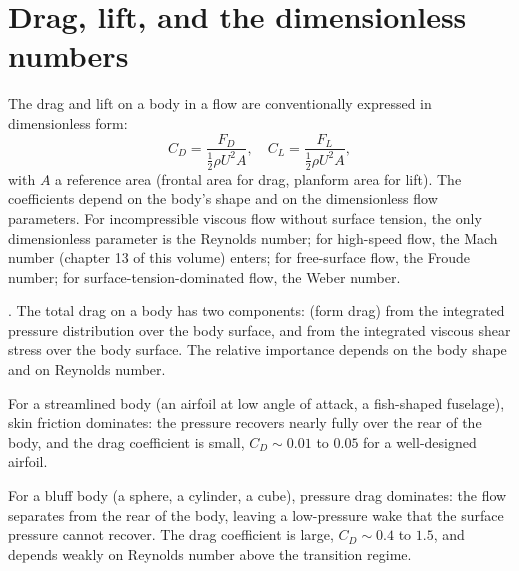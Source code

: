 

\section{Drag, lift, and the dimensionless numbers}

The drag and lift on a body in a flow are conventionally
expressed in dimensionless form:
\[
C_D = \frac{F_D}{\tfrac{1}{2}\rho U^2 A}, \quad
C_L = \frac{F_L}{\tfrac{1}{2}\rho U^2 A},
\]
with $A$ a reference area (frontal area for drag, planform area
for lift). The coefficients depend on the body's shape and on the
dimensionless flow parameters. For incompressible viscous flow
without surface tension, the only dimensionless parameter is the
Reynolds number; for high-speed flow, the Mach number (chapter 13
of this volume) enters; for free-surface flow, the Froude number;
for surface-tension-dominated flow, the Weber number.

. The total drag on a body has two
components:  (form drag) from the integrated
pressure distribution over the body surface, and  from the integrated viscous shear stress over the
body surface. The relative importance depends on the body shape
and on Reynolds number.

For a streamlined body (an airfoil at low angle of attack, a
fish-shaped fuselage), skin friction dominates: the pressure
recovers nearly fully over the rear of the body, and the drag
coefficient is small, $C_D \sim 0.01$ to $0.05$ for a well-designed
airfoil.

For a bluff body (a sphere, a cylinder, a cube), pressure drag
dominates: the flow separates from the rear of the body, leaving a
low-pressure wake that the surface pressure cannot recover. The
drag coefficient is large, $C_D \sim 0.4$ to $1.5$, and depends
weakly on Reynolds number above the transition regime.

